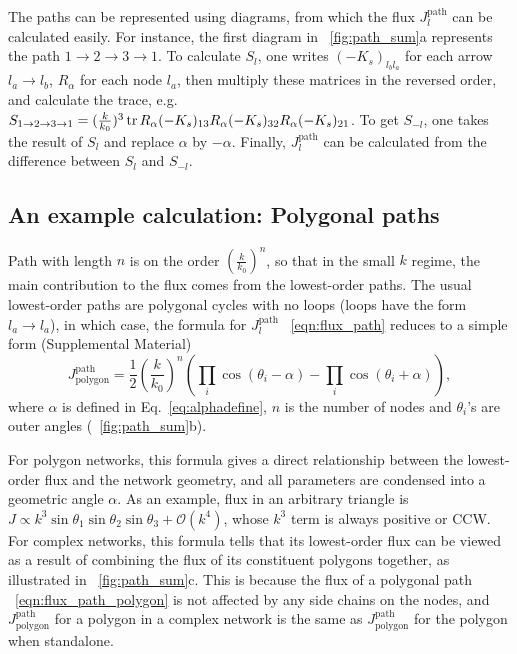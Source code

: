 \documentclass[
 preprint,
 preprintnumbers,
 amsmath,amssymb,
 aps,
 pre,
 longbibliography,
 superscriptaddress,
 10pt, twocolumn
]{revtex4-1}
\begin{document}
The paths can be represented using diagrams, from which the flux $J^\text{path}_l$ can be calculated easily. For instance, the first diagram in \figurename~\ref{fig:path_sum}a represents the path $1\rightarrow 2\rightarrow 3\rightarrow 1$. To calculate $S_l$, one writes $(-K_s)_{l_bl_a}$ for each arrow $l_a\rightarrow l_b$, $R_\alpha$ for each node $l_a$, then multiply these matrices in the reversed order, and calculate the trace, e.g. $S_{1\rightarrow 2\rightarrow 3\rightarrow 1} = (\frac{k}{k_0})^3 \tr R_\alpha (-K_s)_{13} R_\alpha (-K_s)_{32} R_\alpha (-K_s)_{21}$. To get $S_{-l}$, one takes the result of $S_l$ and replace $\alpha$ by $-\alpha$. Finally, $J^\text{path}_l$ can be calculated from the difference between $S_l$ and $S_{-l}$.

\subsection{An example calculation: Polygonal paths}
Path with length $n$ is on the order $(\frac{k}{k_0})^n$, so that in the small $k$ regime, the main contribution to the flux comes from the lowest-order paths.
The usual lowest-order paths are polygonal cycles with no loops (loops have the form $l_a\rightarrow l_a$), in which case, the formula for $J^\text{path}_l$ \eqnname~\eqref{eqn:flux_path} reduces to a simple form (Supplemental Material)
\begin{equation} \label{eqn:flux_path_polygon}
    J^\text{path}_\text{polygon} = \frac{1}{2} (\frac{k}{k_0})^n (\prod_i \cos(\theta_i - \alpha) - \prod_i \cos(\theta_i + \alpha)),
\end{equation}
where $\alpha$ is defined in Eq.~\ref{eq:alphadefine}, $n$ is the number of nodes and $\theta_i$'s are outer angles (\figurename~\ref{fig:path_sum}b). 

For polygon networks, this formula gives a direct relationship between the lowest-order flux and the network geometry, and all parameters are condensed into a geometric angle $\alpha$. As an example, flux in an arbitrary triangle is $J \propto k^3 \sin\theta_1\sin\theta_2\sin\theta_3 + \mathcal{O}(k^4)$, whose $k^3$ term is always positive or CCW.
For complex networks, this formula tells that its lowest-order flux can be viewed as a result of combining the flux of its constituent polygons together, as illustrated in \figurename~\ref{fig:path_sum}c. This is because the flux of a polygonal path \eqnname~\eqref{eqn:flux_path_polygon} is not affected by any side chains on the nodes, and $J^\text{path}_\text{polygon}$ for a polygon in a complex network is the same as $J^\text{path}_\text{polygon}$ for the polygon when standalone. 
\end{document}
